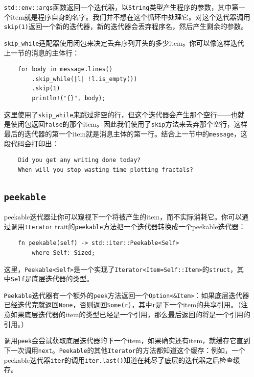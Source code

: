 \texttt{std::env::args}函数返回一个迭代器，以\texttt{String}类型产生程序的参数，其中第一个item就是程序自身的名字。我们并不想在这个循环中处理它。对这个迭代器调用\texttt{skip(1)}返回一个新的迭代器，新的迭代器会丢弃程序名，然后产生剩余的参数。

\texttt{skip\_while}适配器使用闭包来决定丢弃序列开头的多少item。你可以像这样迭代上一节的消息的主体行：
\begin{verbatim}
    for body in message.lines()
        .skip_while(|l| !l.is_empty())
        .skip(1)
        println!("{}", body);
\end{verbatim}

这里使用了\texttt{skip\_while}来跳过非空的行，但这个迭代器会产生那个空行——也就是使闭包返回\texttt{false}的那个item。因此我们使用了\texttt{skip}方法来丢弃那个空行，这样最后的迭代器的第一个item就是消息主体的第一行。结合上一节中的\texttt{message}，这段代码会打印出：
\begin{verbatim}
    Did you get any writing done today?
    When will you stop wasting time plotting fractals?
\end{verbatim}

\subsection{\texttt{peekable}}
peekable迭代器让你可以窥视下一个将被产生的item，而不实际消耗它。你可以通过调用\texttt{Iterator} trait的\texttt{peekable}方法把一个迭代器转换成一个peekable迭代器：
\begin{verbatim}
    fn peekable(self) -> std::iter::Peekable<Self>
        where Self: Sized;
\end{verbatim}
这里，\texttt{Peekable<Self>}是一个实现了\texttt{Iterator<Item=Self::Item>}的\texttt{struct}，其中\texttt{Self}是底层迭代器的类型。

\texttt{Peekable}迭代器有一个额外的\texttt{peek}方法返回一个\texttt{Option<\&Item>}：如果底层迭代器已经迭代完就返回\texttt{None}，否则返回\texttt{Some(r)}，其中\texttt{r}是下一个item的共享引用。（注意如果底层迭代器的item的类型已经是一个引用，那么最后返回的将是一个引用的引用。）

调用\texttt{peek}会尝试获取底层迭代器的下一个item，如果确实还有item，就缓存它直到下一次调用\texttt{next}。\texttt{Peekable}的其他\texttt{Iterator}的方法都知道这个缓存：例如，一个peekable迭代器\texttt{iter}的调用\texttt{iter.last()}知道在耗尽了底层的迭代器之后检查缓存。

